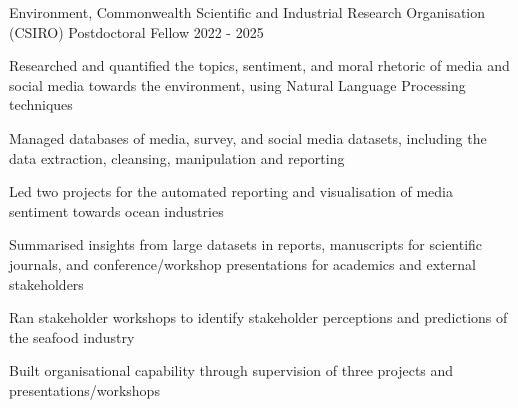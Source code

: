 


\begin{cventries}

  \cventry
    {Environment, Commonwealth Scientific and Industrial Research Organisation (CSIRO)} %
    {Postdoctoral Fellow} %
    {}%
    {2022 - 2025} %
    { %
      \begin{cvitems}
        \item Researched and quantified the topics, sentiment, and moral rhetoric of media and social media towards the environment, using Natural Language Processing techniques
       \item Managed databases of media, survey, and social media datasets, including the data extraction, cleansing, manipulation and reporting
        \item Led two projects for the automated reporting and visualisation of media sentiment towards ocean industries
        \item Summarised insights from large datasets in reports, manuscripts for scientific journals, and conference/workshop presentations for academics and external stakeholders
        \item Ran stakeholder workshops to identify stakeholder perceptions and predictions of the seafood industry
        \item Built organisational capability through supervision of three projects and presentations/workshops
      \end{cvitems}
    }


\end{cventries}
